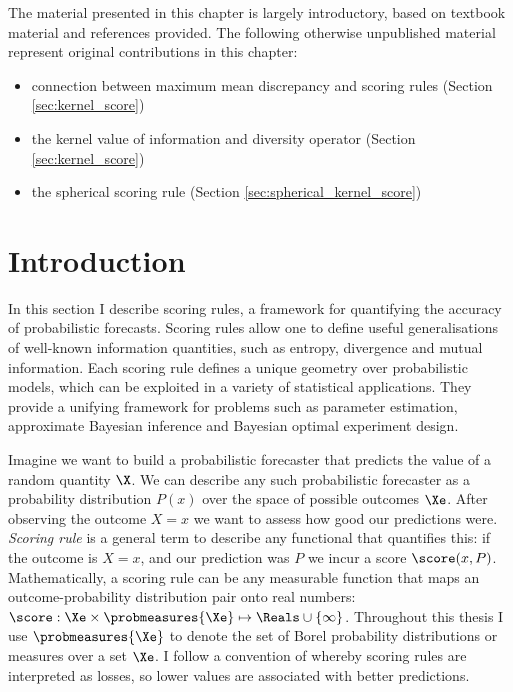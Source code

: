 
\begin{summarycontributions}
The material presented in this chapter is largely introductory, based on textbook material and references provided. The following otherwise unpublished material represent original contributions in this chapter:
\begin{itemize}[noitemsep,topsep=0pt,parsep=0pt,partopsep=0pt]
	\item connection between maximum mean discrepancy and scoring rules (Section \ref{sec:kernel_score})
	\item the kernel value of information and diversity operator (Section \ref{sec:kernel_score})
	\item the spherical scoring rule (Section \ref{sec:spherical_kernel_score})
\end{itemize}
\end{summarycontributions}
\section{Introduction}

In this section I describe scoring rules, a framework for quantifying the accuracy of probabilistic forecasts. Scoring rules allow one to define useful generalisations of well-known information quantities, such as entropy, divergence and mutual information. Each scoring rule defines a unique geometry over probabilistic models, which can be exploited in a variety of statistical applications. They provide a unifying framework for problems such as parameter estimation, approximate Bayesian inference and Bayesian optimal experiment design.

Imagine we want to build a probabilistic forecaster that predicts the value of a random quantity $\X$. We can describe any such probabilistic forecaster as a probability distribution $P(x)$ over the space of possible outcomes $\Xe$. After observing the outcome $X=x$ we want to assess how good our predictions were. \emph{Scoring rule} is a general term to describe any functional that quantifies this: if the outcome is $X=x$, and our prediction was $P$ we incur a score $\score (x,P)$.  Mathematically, a scoring rule can be any measurable function that maps an outcome-probability distribution pair onto real numbers: $\score:\Xe\times\probmeasures{\Xe}\mapsto\Reals\cup\{\infty\}$. Throughout this thesis I use $\probmeasures{\Xe}$ to denote the set of Borel probability distributions or measures over a set $\Xe$. I follow a convention of \citet{Dawid1994} whereby scoring rules are interpreted as losses, so lower values are associated with better predictions.

